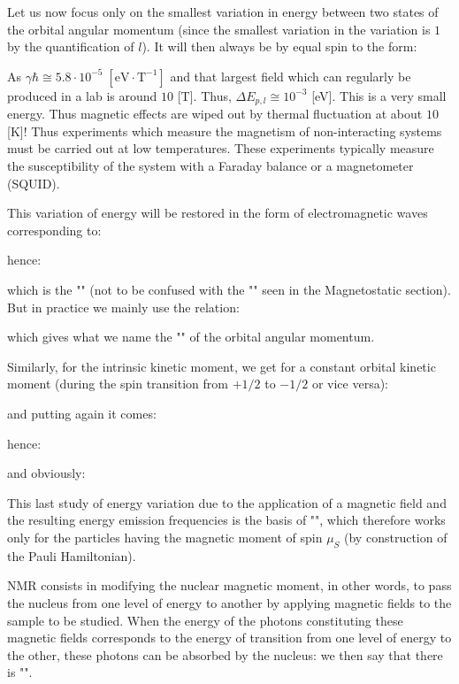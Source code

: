 	Let us now focus only on the smallest variation in energy between two states of the orbital angular momentum (since the smallest variation in the variation is $1$ by the quantification of $l$). It will then always be by equal spin to the form:
	
	\begin{tcolorbox}[title=Remark,colframe=black,arc=10pt]
	As $\gamma\hbar\cong 5.8\cdot 10^{-5}\;[\text{eV}\cdot\text{T}^{-1}]$ and that largest field which can regularly be produced in a lab is around $10$ [T]. Thus, $\Delta E_{p,l}\cong 10^{-3}$ [eV]. This is a very small energy. Thus magnetic effects are wiped out by thermal fluctuation at about $10$ [K]! Thus experiments which measure the magnetism of non-interacting systems must be carried out at low temperatures. These experiments typically measure the susceptibility
of the system with a Faraday balance or a magnetometer (SQUID).
	\end{tcolorbox}
	This variation of energy will be restored in the form of electromagnetic waves corresponding to:
	
	hence:
	
	which is the "" (not to be confused with the "" seen in the Magnetostatic section). But in practice we mainly use the relation:
	
	which gives what we name the "" of the orbital angular momentum.
	
	Similarly, for the intrinsic kinetic moment, we get for a constant orbital kinetic moment (during the spin transition from $+1/2$ to $-1/2$ or vice versa):
	
	and putting again it comes:
	
	hence:
	
	and obviously:
	
	This last study of energy variation due to the application of a magnetic field and the resulting energy emission frequencies is the basis of "", which therefore works only for the particles having the magnetic moment of spin $\mu_S$ (by construction of the Pauli Hamiltonian).
	
	NMR consists in modifying the nuclear magnetic moment, in other words, to pass the nucleus from one level of energy to another by applying magnetic fields to the sample to be studied. When the energy of the photons constituting these magnetic fields corresponds to the energy of transition from one level of energy to the other, these photons can be absorbed by the nucleus: we then say that there is "".
	
